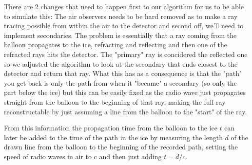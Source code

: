 \documentclass[11pt,a4paper,faculty=we,language=en,doctype=report]{cls/ugent-doc}
\begin{document}
There are 2 changes that need to happen first to our algorithm for us to
be able to simulate this: The air observers needs to be hard removed
as to make a ray tracing possible from within the air to the
detector and second off, we'll need to implement secondaries.
The problem is essentially that a ray coming from the balloon 
propagates to the ice, refracting and reflecting and then one 
of the refracted rays hits the detector. 
The "primary" ray is concidered the reflected one 
so we adjusted the algorithm to look at the secondary that ends
closest to the detector and return that ray. What this has as
a consequence is that the "path" you get back is only the path
from when it "became" a secondary (so only the part below the ice)
but this can be easily fixed as the radio wave just propagates
straight from the balloon to the beginning of that ray,  making 
the full ray reconstructable by just assuming a line from the 
balloon to the "start" of the ray.

From this information the propagation time from the balloon to the ice $t$ 
can later be added to the time of the path in the ice by measuring the 
length $d$ of the drawn line from the balloon to the beginning of the recorded path, 
setting the speed of radio waves in air to c and then just adding $t = d/c$.
\end{document}

